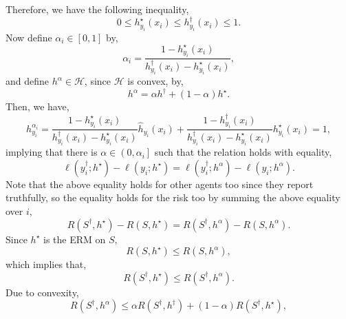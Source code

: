 \documentclass{article}
\begin{document}
Therefore, we have the following inequality,
\begin{equation} 
0 \leq  h^\star _{y_{i}}\left(x_{i}\right) \leq  h^{\dagger}_{y_{i}}\left(x_{i}\right) \leq  1.
\end{equation}
Now define $\alpha_{i} \in \left[0, 1\right]$ by,
\begin{equation} 
\alpha_{i} = \dfrac{1 - h^\star _{y_{i}}\left(x_{i}\right)}{h^{\dagger}_{y_{i}}\left(x_{i}\right) - h^\star _{y_{i}}\left(x_{i}\right)},
\end{equation}
and define $h^{\alpha} \in \mathcal{H}$, since $\mathcal{H}$ is convex, by,
\begin{equation} 
h^{\alpha} = \alpha h^{\dagger} + \left(1 - \alpha\right) h^\star .
\end{equation}
Then, we have,
\begin{equation} 
h^{\alpha_{i}}_{y_{i}} = \dfrac{1 - h^\star _{y_{i}}\left(x_{i}\right)}{h^{\dagger}_{y_{i}}\left(x_{i}\right) - h^\star _{y_{i}}\left(x_{i}\right)} \hat{h}_{y_{i}}\left(x_{i}\right) + \dfrac{1 - h^{\dagger}_{y_{i}}\left(x_{i}\right)}{h^{\dagger}_{y_{i}}\left(x_{i}\right) - h^\star _{y_{i}}\left(x_{i}\right)} h^\star _{y_{i}}\left(x_{i}\right) = 1,
\end{equation}
implying that there is $\alpha \in \left(0, \alpha_{i}\right]$ such that the relation holds with equality,
\begin{equation} 
\ell\left(y^{\dagger}_{i} ; h^\star \right) - \ell\left(y_{i} ; h^\star \right) = \ell\left(y^{\dagger}_{i} ; h^{\alpha}\right) - \ell\left(y_{i} ; h^{\alpha}\right).
\end{equation}
Note that the above equality holds for other agents too since they report truthfully, so the equality holds for the risk too by summing the above equality over $i, $
\begin{equation} 
R\left(S^{\dagger}, h^\star \right) - R\left(S, h^\star \right) = R\left(S^{\dagger}, h^{\alpha}\right) - R\left(S, h^{\alpha}\right).
\end{equation}
Since $h^\star $ is the ERM on $S, $
\begin{equation} 
R(S, h^\star ) \leq  R\left(S, h^{\alpha}\right),
\end{equation}
which implies that,
\begin{equation} 
R\left(S^{\dagger}, h^\star \right) \leq  R\left(S^{\dagger}, h^{\alpha}\right).
\end{equation}
Due to convexity,
\begin{equation} 
R\left(S^{\dagger}, h^{\alpha}\right) \leq  \alpha R\left(S^{\dagger}, h^{\dagger}\right) + \left(1 - \alpha\right) R\left(S^{\dagger}, h^\star \right),
\end{equation}
\end{document}
